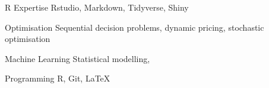 

\begin{cvskills}
  \cvskill
    {R Expertise} %
    {Rstudio, Markdown, Tidyverse, Shiny} %

  \cvskill
    {Optimisation} %
    {Sequential decision problems, dynamic pricing, stochastic optimisation} %
    
  \cvskill
    {Machine Learning} %
    {Statistical modelling, } %

  \cvskill
    {Programming} %
    {R, Git, \LaTeX} %
\end{cvskills}